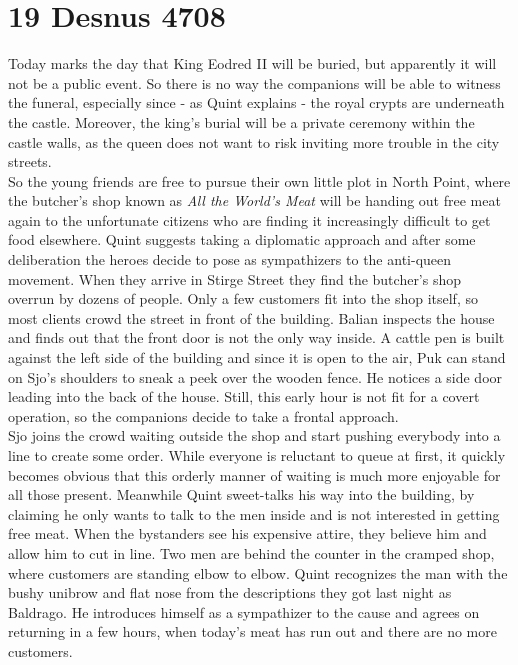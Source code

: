 \section{19 Desnus 4708}

Today marks the day that King Eodred II will be buried, but apparently it will not be a public event. So there is no way the companions will be able to witness the funeral, especially since - as Quint explains - the royal crypts are underneath the castle. Moreover, the king's burial will be a private ceremony within the castle walls, as the queen does not want to risk inviting more trouble in the city streets.\\

So the young friends are free to pursue their own little plot in North Point, where the butcher's shop known as {\itshape All the World's Meat} will be handing out free meat again to the unfortunate citizens who are finding it increasingly difficult to get food elsewhere. Quint suggests taking a diplomatic approach and after some deliberation the heroes decide to pose as sympathizers to the anti-queen movement. When they arrive in Stirge Street they find the butcher's shop overrun by dozens of people. Only a few customers fit into the shop itself, so most clients crowd the street in front of the building. Balian inspects the house and finds out that the front door is not the only way inside. A cattle pen is built against the left side of the building and since it is open to the air, Puk can stand on Sjo's shoulders to sneak a peek over the wooden fence. He notices a side door leading into the back of the house. Still, this early hour is not fit for a covert operation, so the companions decide to take a frontal approach.\\

Sjo joins the crowd waiting outside the shop and start pushing everybody into a line to create some order. While everyone is reluctant to queue at first, it quickly becomes obvious that this orderly manner of waiting is much more enjoyable for all those present. Meanwhile Quint sweet-talks his way into the building, by claiming he only wants to talk to the men inside and is not interested in getting free meat. When the bystanders see his expensive attire, they believe him and allow him to cut in line. Two men are behind the counter in the cramped shop, where customers are standing elbow to elbow. Quint recognizes the man with the bushy unibrow and flat nose from the descriptions they got last night as Baldrago. He introduces himself as a sympathizer to the cause and agrees on returning in a few hours, when today's meat has run out and there are no more customers.\\

